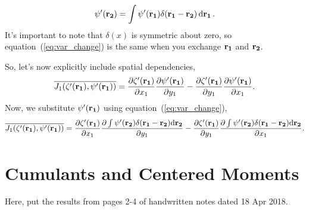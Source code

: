 \documentclass{paper}
\newcommand*{\mean}[1]{\overline{#1}}
\newcommand{\rr}[1]{\vb{r_{#1}}}
\newcommand{\Jac}[3][]{\pdv{#2}{x_{#1}}\pdv{#3}{y_{#1}} - \pdv{#2}{y_{#1}}\pdv{#3}{x_{#1}}}
\begin{document}
\begin{equation}
  \label{eq:var_change}
  \psi'(\rr2) = \int \psi'(\rr1) \delta(\rr1 - \rr2) \dd{\rr1}.
\end{equation}
It's important to note that $\delta(x)$ is symmetric about zero, so equation~(\ref{eq:var_change}) is the same when you exchange $\rr1$ and $\rr2$.

So, let's now explicitly include spatial dependencies,
\begin{equation}
  \label{eq:expanded_J1}
  \mean{J_1(\zeta'(\rr1), \psi'(\rr1))} = \Jac[1]{\zeta'(\rr1)}{\psi'(\rr1)}.
\end{equation}
Now, we substitute $\psi'(\rr1)$ using equation~(\ref{eq:var_change}),
\begin{equation}
  \label{eq:expanded_J1_int}
    \mean{J_1(\zeta'(\rr1), \psi'(\rr1))} = \Jac[1]{\zeta'(\rr1)}{\int \psi'(\rr2) \delta(\rr1 - \rr2) \dd \rr2}.
\end{equation}

\section{Cumulants and Centered Moments}
\label{sec:cumul-cent-moments}

Here, put the results from pages 2-4 of handwritten notes dated 18 Apr 2018.
\end{document}
